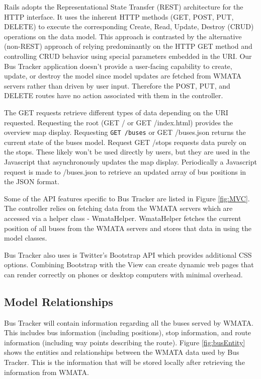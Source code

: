 \documentclass[12pt]{article}
\begin{document}
Rails adopts the Representational State Transfer (REST) architecture for the HTTP interface.  It uses the inherent HTTP methods (GET, POST, PUT, DELETE) to execute the corresponding Create, Read, Update, Destroy (CRUD) operations on the data model.  This approach is contrasted by the alternative (non-REST) approach of relying predominantly on the HTTP GET method and controlling CRUD behavior using special parameters embedded in the URI.  Our Bus Tracker application doesn't provide a user-facing capability to create, update, or destroy the model since model updates are fetched from WMATA servers rather than driven by user input.  Therefore the POST, PUT, and DELETE routes have no action associated with them in the controller.  

The GET requests retrieve different types of data depending on the URI requested.  Requesting the root (GET / or GET /index.html) provides the overview map display.  Requesting \lstinline|GET /buses| or GET /buses.json returns the current state of the buses model.  Request GET /stops requests data purely on the stops.  These likely won't be used directly by users, but they are used in the Javascript that asynchronously updates the map display.  Periodically a Javascript request is made to /buses.json to retrieve an updated array of bus positions in the JSON format.  

Some of the API features specific to Bus Tracker are listed in Figure \ref{fig:MVC}.  The controller relies on fetching data from the WMATA servers which  are accessed via a helper class - WmataHelper.  WmataHelper fetches the current position of all buses from the WMATA servers and stores that data in using the model classes. 

 Bus Tracker also uses is Twitter's Bootstrap API which provides additional CSS options. Combining Bootstrap with the View can create dynamic web pages that can render correctly on phones or desktop computers with minimal overhead.

\subsection*{Model Relationships}

Bus Tracker will contain information regarding all the buses served by WMATA.  This includes bus information (including positions), stop information, and route information (including way points describing the route).  Figure \ref{fig:busEntity} shows the entities and relationships between the WMATA data used by Bus Tracker.  This is the information that will be stored locally after retrieving the information from WMATA.
\end{document}
